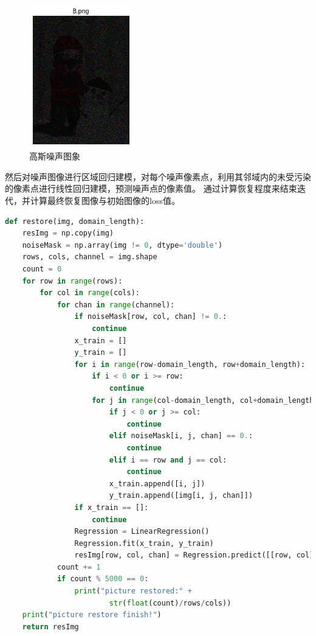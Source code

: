 \documentclass[12pt]{ctexart}
\begin{document}
\begin{figure}[H]
    \centering
    \includegraphics[width=0.4\textwidth]{image/4.png}
    \caption{高斯噪声图象}
\end{figure}

然后对噪声图像进行区域回归建模，对每个噪声像素点，利用其邻域内的未受污染的像素点进行线性回归建模，预测噪声点的像素值。
通过计算恢复程度来结束迭代，并计算最终恢复图像与初始图像的loss值。
\newpage
\begin{lstlisting}[language=Python,caption={复原图像函数}]
def restore(img, domain_length): 
    resImg = np.copy(img)
    noiseMask = np.array(img != 0, dtype='double')
    rows, cols, channel = img.shape
    count = 0
    for row in range(rows):
        for col in range(cols):
            for chan in range(channel):
                if noiseMask[row, col, chan] != 0.:
                    continue
                x_train = []
                y_train = []
                for i in range(row-domain_length, row+domain_length):
                    if i < 0 or i >= row:
                        continue
                    for j in range(col-domain_length, col+domain_length):
                        if j < 0 or j >= col:
                            continue
                        elif noiseMask[i, j, chan] == 0.:
                            continue
                        elif i == row and j == col:
                            continue
                        x_train.append([i, j])
                        y_train.append([img[i, j, chan]])  
                if x_train == []:
                    continue
                Regression = LinearRegression()   
                Regression.fit(x_train, y_train)  
                resImg[row, col, chan] = Regression.predict([[row, col]])
            count += 1
            if count % 5000 == 0:
                print("picture restored:" +
                        str(float(count)/rows/cols))       
    print("picture restore finish!")
    return resImg
\end{lstlisting}
\end{document}
